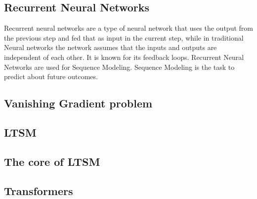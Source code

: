\subsection{Recurrent Neural Networks}
Recurrent neural networks are a type of neural network that uses the output from the previous step and fed that as input in the current step, while in traditional Neural networks the network assumes that the inputs and outputs are independent of each other. It is known for its feedback loops. Recurrent Neural Networks are used for Sequence Modeling. Sequence Modeling is the task to predict about future outcomes. 


\subsection{Vanishing Gradient problem}
\subsection{LTSM}
\subsection{The core of LTSM}
\subsection{Transformers}